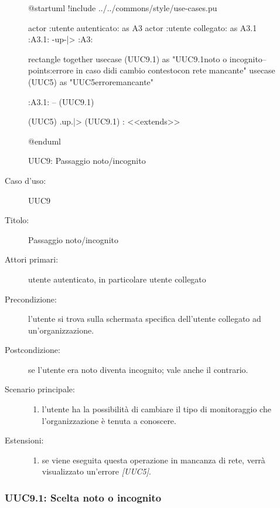 \documentclass[../../../analisi-dei-requisiti.tex]{subfiles}
\begin{document}
\begin{figure}[H]
  \centering
  \begin{plantuml}
  @startuml
  !include ../../commons/style/use-cases.pu

  actor :utente autenticato: as A3
  actor :utente collegato: as A3.1
  :A3.1: -up-|> :A3:

  rectangle {
    together {
      usecase (UUC9.1) as "UUC9.1\nScelta noto o incognito\n--\nExtension points:\nVisualizzazione errore in caso di\noperazione di cambio contesto\n con rete mancante"
      usecase (UUC5) as "UUC5\nVisualizzazione errore\nrete mancante"
    }
  }

  :A3.1: -- (UUC9.1)

  (UUC5) .up.|> (UUC9.1) : <<extends>>

  @enduml
  \end{plantuml}
  \caption{UUC9: Passaggio noto/incognito}
  \label{fig:uuc9}
\end{figure}

\begin{description}
  \item[Caso d’uso:] UUC9
  \item[Titolo:] Passaggio noto/incognito
  \item[Attori primari:] utente autenticato, in particolare utente collegato
  \item[Precondizione:] l'utente si trova sulla schermata specifica dell'utente collegato ad un'organizzazione.
  \item[Postcondizione:] se l'utente era noto diventa incognito; vale anche il contrario.
  \item[Scenario principale:]
        \begin{enumerate}
          \item l'utente ha la possibilità di cambiare il tipo di monitoraggio che l'organizzazione è tenuta a conoscere.
        \end{enumerate}
  \item[Estensioni:]
        \begin{enumerate}
          \item se viene eseguita questa operazione in mancanza di rete, verrà visualizzato un'errore \emph{[UUC5]}.
        \end{enumerate}
\end{description}

\subsubsection{UUC9.1: Scelta noto o incognito}%
\label{subs:UUC9.1}
\end{document}
